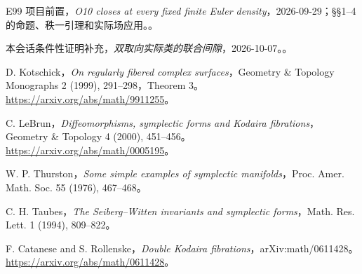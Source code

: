 \documentclass[UTF8,11pt,fontset=none]{ctexart}
\theoremstyle{definition}
\theoremstyle{remark}
\begin{document}
\begin{thebibliography}{E99}
\small
{} 项目前置，\emph{O10 closes at every fixed finite Euler density}，2026-09-29；§§1--4 的命题、秩一引理和实际场应用。。

 本会话条件性证明补充，\emph{双取向实际类的联合间隙}，2026-10-07。。

 D. Kotschick，\emph{On regularly fibered complex surfaces}，Geometry \& Topology Monographs 2 (1999), 291--298，Theorem 3。\url{https://arxiv.org/abs/math/9911255}。

 C. LeBrun，\emph{Diffeomorphisms, symplectic forms and Kodaira fibrations}，Geometry \& Topology 4 (2000), 451--456。\url{https://arxiv.org/abs/math/0005195}。

 W. P. Thurston，\emph{Some simple examples of symplectic manifolds}，Proc. Amer. Math. Soc. 55 (1976), 467--468。

 C. H. Taubes，\emph{The Seiberg--Witten invariants and symplectic forms}，Math. Res. Lett. 1 (1994), 809--822。

 F. Catanese and S. Rollenske，\emph{Double Kodaira fibrations}，arXiv:math/0611428。\url{https://arxiv.org/abs/math/0611428}。

\end{thebibliography}
\end{document}
